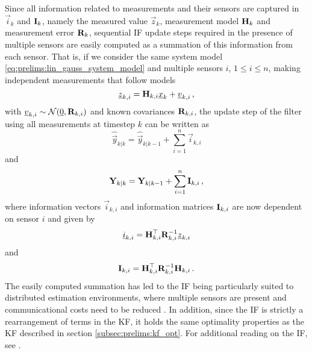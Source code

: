 Since all information related to measurements and their sensors are captured in $\vec{i}_k$ and ${{\mathbf{I}}}_k$, namely the measured value $\vec{z}_k$, measurement model ${{\mathbf{H}}}_k$ and measurement error ${{\mathbf{R}}}_k$, sequential IF update steps required in the presence of multiple sensors are easily computed as a summation of this information from each sensor. That is, if we consider the same system model \eqref{eq:prelims:lin_gauss_system_model} and multiple sensors $i$, $1\leq i\leq n$, making independent measurements that follow models
\begin{equation}
    {\underline{z}}_{k,i} = {{\mathbf{H}}}_{k,i} {\underline{x}}_k + {\underline{v}}_{k,i}\,,
\end{equation}
with ${\underline{v}}_{k, i}\sim\mathcal{N}({\underline{0}},{{\mathbf{R}}}_{k, i})$ and known covariances ${{\mathbf{R}}}_{k, i}$, the update step of the filter using all measurements at timestep $k$ can be written as
\begin{equation}\label{eq:prelims:if_info_vec_update}
    \hat{\vec{y}}_{k|k} = \hat{\vec{y}}_{k|k-1} + \sum_{i=1}^n\vec{i}_{k,i}
\end{equation}
and
\begin{equation}\label{eq:prelims:if_info_mat_update}
    {\ensuremath{{\mathbf{Y}}}}_{k|k} = {{\mathbf{Y}}}_{k|k-1} + \sum_{i=1}^n{{\mathbf{I}}}_{k,i}\,,
\end{equation}
where information vectors $\vec{i}_{k,i}$ and information matrices ${{\mathbf{I}}}_{k,i}$ are now dependent on sensor $i$ and given by
\begin{equation}\label{eq:prelims:if_measurement_vec_defn}
    {\underline{i}}_{k,i} = {{\mathbf{H}}}_{k,i}^\top{\ensuremath{{\mathbf{R}}}}_{k,i}^{-1}{\underline{z}}_{k,i}
\end{equation}
and
\begin{equation}\label{eq:prelims:if_measurement_mat_defn}
    {\ensuremath{{\mathbf{I}}}}_{k,i} = {{\mathbf{H}}}_{k,i}^\top{\ensuremath{{\mathbf{R}}}}_{k,i}^{-1}{{\mathbf{H}}}_{k,i}\,.
\end{equation}
The easily computed summation has led to the IF being particularly suited to distributed estimation environments, where multiple sensors are present and communicational costs need to be reduced \cite{pfaffInformationFormDistributed2017,chandraCubatureInformationFilter2016,assimakisInformationFilterKalman2012,reinhardtDistributedKalmanFiltering2014}. In addition, since the IF is strictly a rearrangement of terms in the KF, it holds the same optimality properties as the KF described in section \ref{subsec:prelims:kf_opt}. For additional reading on the IF, see \cite[Chap. 6]{simonOptimalStateEstimation2006}.

% 
% 

